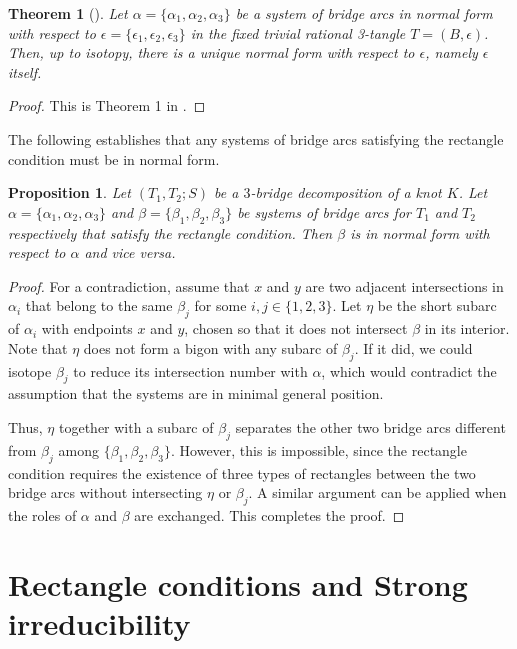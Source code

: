 \documentclass[12pt]{amsart}
\newtheorem{Thm}[theorem]{Theorem}
\newtheorem{Prop}[theorem]{Proposition}
\newcommand{\al}{\alpha}
\newcommand{\be}{\beta}
\newcommand{\ep}{\epsilon}
\begin{document}
\begin{Thm}[\cite{K24}]\label{unique normal form}
Let $\alpha=\{\alpha_1,\alpha_2,\alpha_3\}$ be a system of bridge arcs in normal form with respect to $\ep=\{\ep_1, \ep_2, \ep_3\}$
in the fixed trivial rational 3-tangle $T = (B,\ep)$. Then, up to isotopy, there is a unique normal form with respect to $\ep$, namely $\ep$ itself.
\end{Thm}

\begin{proof}
This is Theorem 1 in \cite{K24}.
\end{proof}

The following establishes that any systems of bridge arcs satisfying the rectangle condition must be in normal form.

\begin{Prop}\label{L4}
Let $(T_1, T_2;S)$ be a $3$-bridge decomposition of a knot $K$. Let $\alpha=\{\alpha_1,\alpha_2,\alpha_3\}$ and $\beta=\{\beta_1,\beta_2,\beta_3\}$ be systems of bridge arcs for $T_1$ and $T_2$ respectively that satisfy the rectangle condition. Then $\beta$ is in normal form with respect to $\alpha$ and vice versa.
\end{Prop}

\begin{proof}
For a contradiction, assume that $x$ and $y$ are two adjacent intersections in $\alpha_i$ that belong to the same $\beta_j$ for some $i, j\in\{1,2,3\}$. Let $\eta$ be the short subarc of $\alpha_i$ with endpoints $x$ and $y$, chosen so that it does not intersect $\be$ in its interior. Note that $\eta$ does not form a bigon with any subarc of $\beta_j$. If it did, we could isotope $\beta_j$ to reduce its intersection number with $\al$, which would contradict the assumption that the systems are in minimal general position.

Thus, $\eta$ together with a subarc of $\beta_j$ separates the other two bridge arcs different from $\beta_j$ among $\{\beta_1,\beta_2,\beta_3\}$. However, this is impossible, since the rectangle condition requires the existence of three types of rectangles between the two bridge arcs without intersecting $\eta$ or $\beta_j$. A similar argument can be applied when the roles of $\al$ and $\be$ are exchanged. This completes the proof.
\end{proof}


\section{Rectangle conditions and Strong irreducibility}\label{B3}
\end{document}
